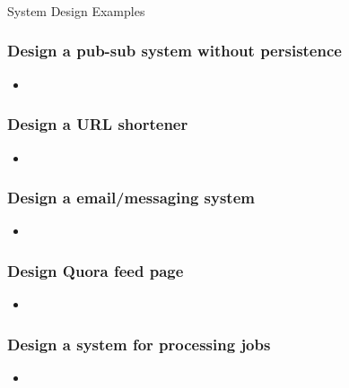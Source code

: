 \begin{frame}[fragile]\frametitle{}
\begin{center}
{\Large System Design Examples}
\end{center}

\end{frame}


\begin{frame}
	\frametitle{Design a pub-sub system without persistence }
		
			\begin{itemize}
				\item 
			\end{itemize}
\end{frame}

\begin{frame}
	\frametitle{Design a URL shortener }
		
			\begin{itemize}
				\item 
			\end{itemize}
\end{frame}

\begin{frame}
	\frametitle{Design a email/messaging system}
		
			\begin{itemize}
				\item 
			\end{itemize}
\end{frame}

\begin{frame}
	\frametitle{Design Quora feed page }
		
			\begin{itemize}
				\item 
			\end{itemize}
\end{frame}

\begin{frame}
	\frametitle{Design a system for processing jobs}
		
			\begin{itemize}
				\item 
			\end{itemize}
\end{frame}

